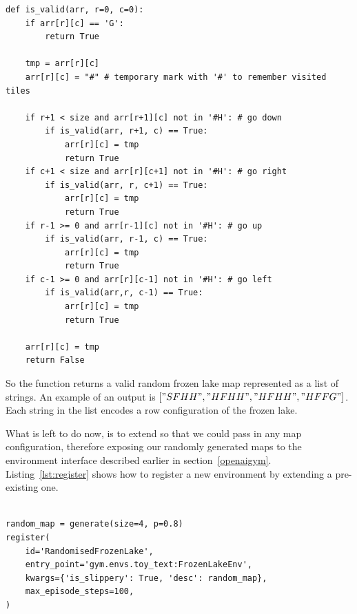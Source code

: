 \begin{minipage}{\linewidth}
\lstset{language=Python}
\lstset{frame=lines}
\lstset{basicstyle=\footnotesize}
\begin{lstlisting}
def is_valid(arr, r=0, c=0):
    if arr[r][c] == 'G':
        return True

    tmp = arr[r][c]
    arr[r][c] = "#" # temporary mark with '#' to remember visited tiles
    
    if r+1 < size and arr[r+1][c] not in '#H': # go down
        if is_valid(arr, r+1, c) == True:
            arr[r][c] = tmp
            return True
    if c+1 < size and arr[r][c+1] not in '#H': # go right
        if is_valid(arr, r, c+1) == True:
            arr[r][c] = tmp
            return True
    if r-1 >= 0 and arr[r-1][c] not in '#H': # go up
        if is_valid(arr, r-1, c) == True:
            arr[r][c] = tmp
            return True
    if c-1 >= 0 and arr[r][c-1] not in '#H': # go left
        if is_valid(arr,r, c-1) == True:
            arr[r][c] = tmp
            return True
            
    arr[r][c] = tmp
    return False
\end{lstlisting}
\end{minipage}

So the  function returns a valid random frozen lake map represented as a list of strings. An example of an output is $["SFHH", "HFHH", "HFHH", "HFFG"]$. Each string in the list encodes a row configuration of the frozen lake.

What is left to do now, is to extend  so that we could pass in any map configuration, therefore exposing our randomly generated maps to the  environment interface described earlier in section~\ref{openaigym}. Listing~\ref{lst:register} shows how to register a new environment by extending a pre-existing one.
\\\\
\begin{minipage}{\linewidth}
\lstset{language=Python}
\lstset{frame=lines}
\lstset{basicstyle=\footnotesize}
\begin{lstlisting}
random_map = generate(size=4, p=0.8)
register(
    id='RandomisedFrozenLake',
    entry_point='gym.envs.toy_text:FrozenLakeEnv',
    kwargs={'is_slippery': True, 'desc': random_map},
    max_episode_steps=100,
)
\end{lstlisting}
\end{minipage}


